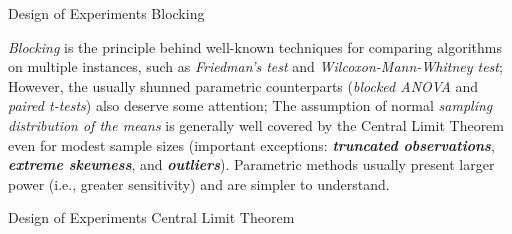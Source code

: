 \documentclass[t]{beamer}
\begin{document}

\begin{ftst}
{Design of Experiments}
{Blocking}
\textit{Blocking} is the principle behind well-known techniques for comparing algorithms on multiple instances, such as \textit{Friedman's test} and \textit{Wilcoxon-Mann-Whitney test};
\vone
However, the usually shunned parametric counterparts (\textit{blocked ANOVA} and \textit{paired t-tests}) also deserve some attention;
\vone
The assumption of normal \textit{sampling distribution of the means} is generally well covered by the Central Limit Theorem even for modest sample sizes (important exceptions: \textbf{\textit{truncated observations}}, \textbf{\textit{extreme skewness}}, and \textbf{\textit{outliers}}).
\vone
Parametric methods usually present larger power (i.e., greater sensitivity) and are simpler to understand.
\end{ftst}


\begin{ftst}
{Design of Experiments}
{Central Limit Theorem}
\end{ftst}

%
%

\end{document}
